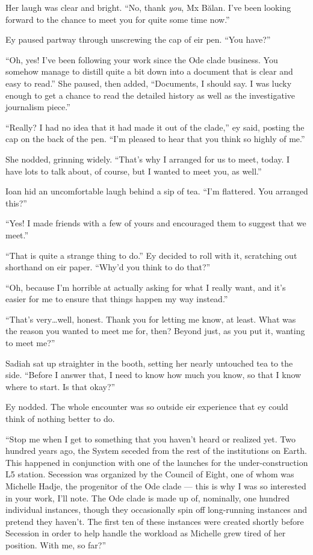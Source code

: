 Her laugh was clear and bright. ``No, thank \emph{you}, Mx Bălan. I've been looking forward to the chance to meet you for quite some time now.''

Ey paused partway through unscrewing the cap of eir pen. ``You have?''

``Oh, yes! I've been following your work since the Ode clade business. You somehow manage to distill quite a bit down into a document that is clear and easy to read.'' She paused, then added, ``Documents, I should say. I was lucky enough to get a chance to read the detailed history as well as the investigative journalism piece.''

``Really? I had no idea that it had made it out of the clade,'' ey said, posting the cap on the back of the pen. ``I'm pleased to hear that you think so highly of me.''

She nodded, grinning widely. ``That's why I arranged for us to meet, today. I have lots to talk about, of course, but I wanted to meet you, as well.''

Ioan hid an uncomfortable laugh behind a sip of tea. ``I'm flattered. You arranged this?''

``Yes! I made friends with a few of yours and encouraged them to suggest that we meet.''

``That is quite a strange thing to do.'' Ey decided to roll with it, scratching out shorthand on eir paper. ``Why'd you think to do that?''

``Oh, because I'm horrible at actually asking for what I really want, and it's easier for me to ensure that things happen my way instead.''

``That's very\ldots well, honest. Thank you for letting me know, at least. What was the reason you wanted to meet me for, then? Beyond just, as you put it, wanting to meet me?''

Sadiah sat up straighter in the booth, setting her nearly untouched tea to the side. ``Before I answer that, I need to know how much you know, so that I know where to start. Is that okay?''

Ey nodded. The whole encounter was so outside eir experience that ey could think of nothing better to do.

``Stop me when I get to something that you haven't heard or realized yet. Two hundred years ago, the System seceded from the rest of the institutions on Earth. This happened in conjunction with one of the launches for the under-construction L5 station. Secession was organized by the Council of Eight, one of whom was Michelle Hadje, the progenitor of the Ode clade — this is why I was so interested in your work, I'll note. The Ode clade is made up of, nominally, one hundred individual instances, though they occasionally spin off long-running instances and pretend they haven't. The first ten of these instances were created shortly before Secession in order to help handle the workload as Michelle grew tired of her position. With me, so far?''

